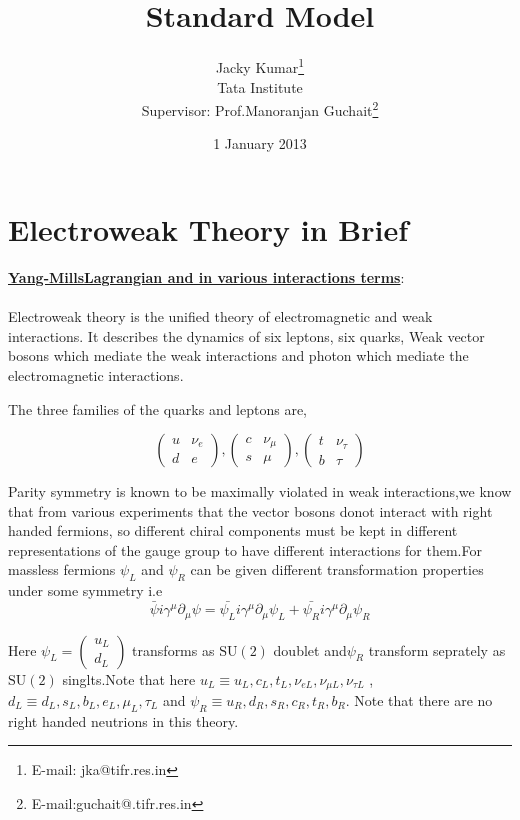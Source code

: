 \documentclass[12pt]{article}
\title{\normalsize \hfill \\[1cm]
\LARGE \bf{Standard Model}}
\author{
Jacky Kumar\thanks{E-mail: jka@tifr.res.in} \\
Tata Institute\\
Supervisor: Prof.Manoranjan Guchait\thanks{E-mail:guchait@.tifr.res.in}}
\date{1 January 2013}
\newcommand{\be}{\begin{equation}}
\newcommand{\ee}{\end{equation}}
\begin{document}
\maketitle


\newpage 
\section{\Large {\bf{Electroweak Theory in Brief}}}
\textbf{ \underline{Yang-MillsLagrangian and in various interactions terms}}: \\ \\ 

Electroweak theory is the unified theory of electromagnetic and weak interactions. It describes the dynamics of six leptons, six quarks, Weak vector bosons which mediate the weak interactions and photon which mediate the electromagnetic interactions. 

The three families of the quarks and leptons are,

%
$$\left( \begin{array}{cc} u & \nu_{e} \\ d & e  \end{array} \right), \left( \begin{array}{cc} c & \nu_{\mu}  \\ s & \mu  \end{array} \right),\left( \begin{array}{cc} t & \nu_{\tau} \\ b & \tau  \end{array} \right)$$
%

Parity symmetry is known to be maximally violated in weak interactions,we know that from various experiments that the vector bosons donot interact with right handed fermions, so different chiral components must be kept in different representations of the gauge group to have different interactions for them.For massless fermions $\psi_{L}$ and $\psi_{R}$ can be given different transformation properties under some symmetry i.e
%
\be  \bar{\psi}i \gamma^{\mu} \partial_{\mu} \psi  = \bar{\psi_{L}}i\gamma^{\mu} \partial_{\mu}\psi_{L}+\bar{\psi_{R}}i\gamma^{\mu}\partial_{\mu} \psi_{R}\ee

Here 
$\psi_{L}=\left( \begin{array}{c} u_{L}  \\ d_{L}   \end{array} \right) $ transforms as  $\mathrm{SU}(2)$ doublet and$ \psi_{R}$ transform seprately as $\mathrm{SU}(2)$ singlts.Note that here $u_{L}\equiv u_{L},c_{L},t_{L},\nu_{eL},\nu_{\mu L},\nu_{\tau L}$ ,$d_{L}\equiv d_{L},s_{L},b_{L},e_{L},\mu_{L},\tau_{L}$ 
 and $ \psi_{R}\equiv u_{R},d_{R},s_{R},c_{R},t_{R},b_{R}$. Note that there are no right handed neutrions in this theory. 
\end{document}
